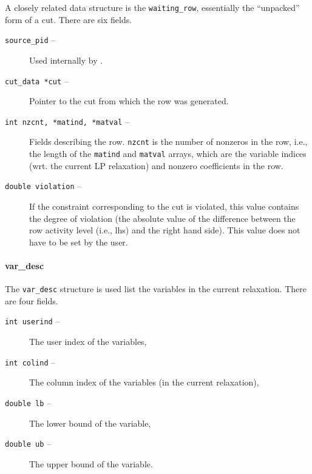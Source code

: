 \begin{description}
A closely related data structure is the {\tt waiting\_row},
essentially the ``unpacked'' form of a cut. There are six fields.

\begin{description}

\item[{\tt source\_pid} --] Used internally by \BB.

\item[{\tt cut\_data *cut} --] Pointer to the cut from which the row was generated.

\item[{\tt int nzcnt, *matind, *matval} --] Fields describing the row. {\tt nzcnt} is the number of nonzeros in
the row, i.e., the length of the {\tt matind} and {\tt matval} arrays,
which are the variable indices (wrt. the current LP relaxation) and
nonzero coefficients in the row.

\item[{\tt double violation} --] If the constraint corresponding to the cut is violated, this value
contains the degree of violation (the absolute value of the difference
between the row activity level (i.e., lhs) and the right hand
side). This value does not have to be set by the user.

\end{description}

\begin{htmlonly}
\paragraph{var\_desc}
\end{htmlonly}

The {\tt var\_desc} structure is used list the variables in the current
relaxation. There are four fields.

\begin{description}
\item[{\tt int userind} --] The user index of the variables,
\item[{\tt int colind} --] The column index of the variables (in the
current relaxation),
\item[{\tt double lb} --] The lower bound of the variable,
\item[{\tt double ub} --] The upper bound of the variable.
\end{description}

\end{description}

